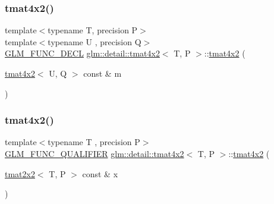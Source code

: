 \mbox{\label{structglm_1_1detail_1_1tmat4x2_a4aa43b25aaebbe320d3442f1a222c229}} 
\subsubsection{\texorpdfstring{tmat4x2()}{tmat4x2()}\hspace{0.1cm}{\footnotesize\ttfamily [10/22]}}
{\footnotesize\ttfamily template$<$typename T, precision P$>$ \\
template$<$typename U , precision Q$>$ \\
\hyperlink{setup_8hpp_ab2d052de21a70539923e9bcbf6e83a51}{G\+L\+M\+\_\+\+F\+U\+N\+C\+\_\+\+D\+E\+CL} \hyperlink{structglm_1_1detail_1_1tmat4x2}{glm\+::detail\+::tmat4x2}$<$ T, P $>$\+::\hyperlink{structglm_1_1detail_1_1tmat4x2}{tmat4x2} (\begin{DoxyParamCaption}\item[{\hyperlink{structglm_1_1detail_1_1tmat4x2}{tmat4x2}$<$ U, Q $>$ const \&}]{m }\end{DoxyParamCaption})\hspace{0.3cm}{\ttfamily [explicit]}}

\mbox{\label{structglm_1_1detail_1_1tmat4x2_a0092bc7d0c201c76adfe3ae1b7a78cdf}} 
\subsubsection{\texorpdfstring{tmat4x2()}{tmat4x2()}\hspace{0.1cm}{\footnotesize\ttfamily [11/22]}}
{\footnotesize\ttfamily template$<$typename T , precision P$>$ \\
\hyperlink{setup_8hpp_a33fdea6f91c5f834105f7415e2a64407}{G\+L\+M\+\_\+\+F\+U\+N\+C\+\_\+\+Q\+U\+A\+L\+I\+F\+I\+ER} \hyperlink{structglm_1_1detail_1_1tmat4x2}{glm\+::detail\+::tmat4x2}$<$ T, P $>$\+::\hyperlink{structglm_1_1detail_1_1tmat4x2}{tmat4x2} (\begin{DoxyParamCaption}\item[{\hyperlink{structglm_1_1detail_1_1tmat2x2}{tmat2x2}$<$ T, P $>$ const \&}]{x }\end{DoxyParamCaption})\hspace{0.3cm}{\ttfamily [explicit]}}



